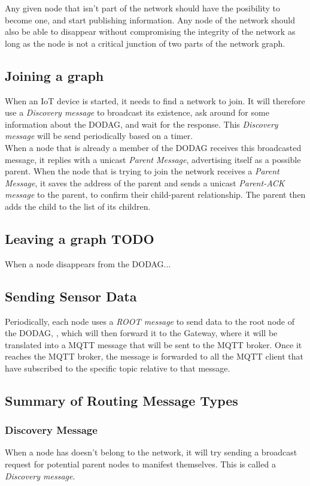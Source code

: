 \documentclass[a4paper,11pt]{article}
\begin{document}
Any given node that isn't part of the network should have the posibility to become one, and start publishing information. Any node of the network should also be able to disappear without compromising the integrity of the network as long as the node is not a critical junction of two parts of the network graph.

\subsection{Joining a graph}
When an IoT device is started, it needs to find a network to join. It will therefore use a \textit{Discovery message} to broadcast its existence, ask around for some information about the DODAG, and wait for the response. This \textit{Discovery message} will be send periodically based on a timer.\\

When a node that is already a member of the DODAG receives this broadcasted message, it replies with a unicast \textit{Parent Message}, advertising itself as a possible parent. When the node that is trying to join the network receives a \textit{Parent Message}, it saves the address of the parent and sends a unicast \textit{Parent-ACK message} to the parent, to confirm their child-parent relationship. The parent then adds the child to the list of its children.

\subsection{Leaving a graph TODO}
When a node disappears from the DODAG...

\subsection{Sending Sensor Data}
Periodically, each node uses a \textit{ROOT message} to send data to the root node of the DODAG, , which will then forward it to the Gateway, where it will be translated into a MQTT message that will be sent to the MQTT broker. Once it reaches the MQTT broker, the message is forwarded to all the MQTT client that have subscribed to the specific topic relative to that message.

\subsection{Summary of Routing Message Types}
\subsubsection{Discovery Message}
When a node has doesn't belong to the network, it will try sending a broadcast request for potential parent nodes to manifest themselves. This is called a \textit{Discovery message}.
\end{document}
